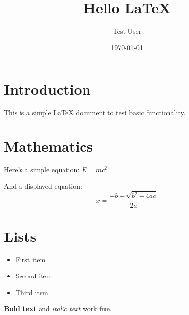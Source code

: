 \documentclass{article}
\title{Hello LaTeX}
\author{Test User}
\date{\today}
\begin{document}
\maketitle

\section{Introduction}
This is a simple \LaTeX{} document to test basic functionality.

\section{Mathematics}
Here's a simple equation: $E = mc^2$

And a displayed equation:
\begin{equation}
x = \frac{-b \pm \sqrt{b^2 - 4ac}}{2a}
\end{equation}

\section{Lists}
\begin{itemize}
    \item First item
    \item Second item
    \item Third item
\end{itemize}

\textbf{Bold text} and \textit{italic text} work fine.
\end{document}
